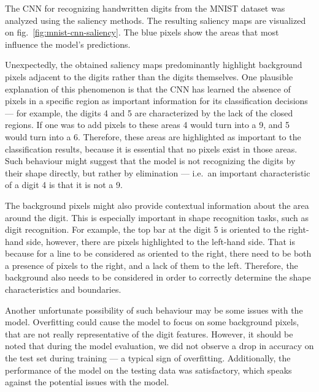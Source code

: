 \documentclass[journal, a4paper]{IEEEtran}
\begin{document}
The CNN for recognizing handwritten digits from the MNIST dataset was analyzed using the saliency methods.
The resulting saliency maps are visualized on fig.~\ref{fig:mnist-cnn-saliency}.
The blue pixels show the areas that most influence the model's predictions.

Unexpectedly, the obtained saliency maps predominantly highlight background pixels adjacent to the digits
rather than the digits themselves.
One plausible explanation of this phenomenon is that the CNN has learned the absence of pixels in a specific region as
important information for its classification decisions --- for example, the digits 4 and 5 are characterized by the lack of the closed regions.
If one was to add pixels to these areas 4 would turn into a 9, and 5 would turn into a 6.
Therefore, these areas are highlighted as important to the classification results, because it is essential that no pixels exist in those areas.
Such behaviour might suggest that the model is not recognizing the digits by their shape directly, but rather by elimination --- i.e.\ an important characteristic of a digit 4 is that it is not a 9.

The background pixels might also provide contextual information about the area around the digit.
This is especially important in shape recognition tasks, such as digit recognition.
For example, the top bar at the digit 5 is oriented to the right-hand side, however, there are pixels highlighted to the left-hand side.
That is because for a line to be considered as oriented to the right, there need to be both a presence of pixels to the right, and a lack of them to the left.
Therefore, the background also needs to be considered in order to correctly determine the shape characteristics and boundaries.

Another unfortunate possibility of such behaviour may be some issues with the model.
Overfitting could cause the model to focus on some background pixels, that are not really representative of the digit features.
However, it should be noted that during the model evaluation, we did not observe a drop in accuracy on the test set during training --- a typical sign of overfitting.
Additionally, the performance of the model on the testing data was satisfactory, which speaks against the potential issues with the model.
\end{document}
